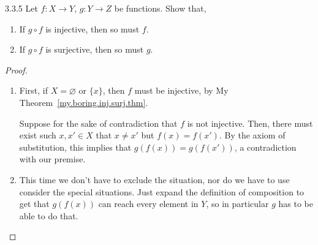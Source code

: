 \begin{exercise}{3.3.5}
	Let $f: X \to Y$, $g: Y \to Z$ be functions. Show that,
	\begin{enumerate}
		\item If $g \circ f$ is injective, then so must $f$.
		\item If $g \circ f$ is surjective, then so must $g$.
	\end{enumerate}
\end{exercise}
\begin{proof}\leavevmode
	\begin{enumerate}
		\item First, if $X = \varnothing$ or $\{x\}$, then $f$ must be injective, by My Theorem~\ref{my.boring.inj.surj.thm}.
		
		Suppose for the sake of contradiction that $f$ is not injective. Then, there must exist such $x,x' \in X$ that $x \ne x'$ but $f(x) = f(x')$. By the axiom of substitution, this implies that $g(f(x)) = g(f(x'))$, a contradiction with our premise.
		
		\item This time we don't have to exclude the situation, nor do we have to use consider the special situations. Just expand the definition of composition to get that $g(f(x))$ can reach every element in $Y$, so in particular $g$ has to be able to do that.
	\end{enumerate}
\end{proof}

